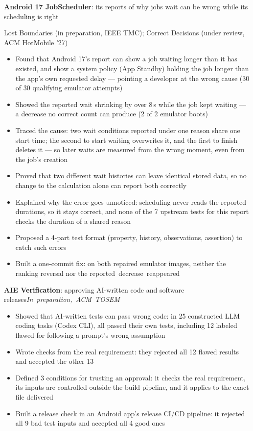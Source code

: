\documentclass[10pt]{article}
\newcommand{\project}[3]{%
 \par\needspace{3\baselineskip}\vspace{10pt}%
 {\noindent\hspace*{1.8em}\textbf{#1}#2\hfill\mbox{\small\itshape #3}\par}%
}
\newcommand{\subitemnote}[1]{{\noindent\hspace*{1.8em}\small\color{subtextcolor}#1\par}}
\begin{document}
\project{Android 17 JobScheduler}{: its reports of why jobs wait can be wrong while its scheduling is right}{}
\subitemnote{Lost Boundaries (in preparation, IEEE TMC); Correct Decisions (under review, ACM HotMobile '27)}
\begin{itemize}[leftmargin=3em]
 \item Found that Android 17's report can show a job waiting longer than it has existed, and show a system policy (App Standby) holding the job longer than the app's own requested delay --- pointing a developer at the wrong cause (30 of 30 qualifying emulator attempts)
 \item Showed the reported wait shrinking by over 8\,s while the job kept waiting --- a decrease no correct count can produce (2 of 2 emulator boots)
 \item Traced the cause: two wait conditions reported under one reason share one start time; the second to start waiting overwrites it, and the first to finish deletes it --- so later waits are measured from the wrong moment, even from the job's creation
 \item Proved that two different wait histories can leave identical stored data, so no change to the calculation alone can report both correctly
 \item Explained why the error goes unnoticed: scheduling never reads the reported durations, so it stays correct, and none of the 7 upstream tests for this report checks the duration of a shared reason
 \item Proposed a 4-part test format (property, history, observations, assertion) to catch such errors
 \item Built a one-commit fix: on both repaired emulator images, neither the ranking reversal nor the reported~decrease~reappeared
\end{itemize}

\project{AIE Verification}{: approving AI-written code and software releases}{In preparation, ACM TOSEM}
\begin{itemize}[leftmargin=3em]
 \item Showed that AI-written tests can pass wrong code: in 25 constructed LLM coding tasks (Codex CLI), all passed their own tests, including 12 labeled flawed for following a prompt's wrong assumption
 \item Wrote checks from the real requirement: they rejected all 12 flawed results and accepted the other 13
 \item Defined 3 conditions for trusting an approval: it checks the real requirement, its inputs are controlled outside the build pipeline, and it applies to the exact file delivered
 \item Built a release check in an Android app's release CI/CD pipeline: it rejected all 9 bad test inputs and accepted all 4 good ones
\end{itemize}
\end{document}
